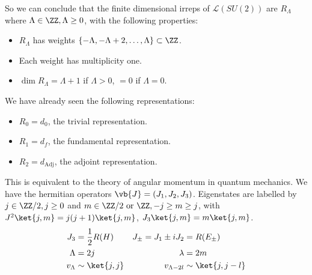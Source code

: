 \documentclass{jknotes}
\begin{document}
So we can conclude that the finite dimensional irreps of \(\mathcal{L}(SU(2))\) are \(R_\Lambda\) where \(\Lambda \in \ZZ, \Lambda \ge 0\), with the following properties:
\begin{itemize}
    \item \(R_\Lambda\) has weights \(\{-\Lambda,-\Lambda+2,\dots,\Lambda\} \subset \ZZ\).
    \item Each weight has multiplicity one.
    \item \(\dim R_\Lambda = \Lambda+1\) if \(\Lambda > 0\), \(= 0\) if \(\Lambda = 0\).
\end{itemize}
\begin{eg}
    We have already seen the following representations:
    \begin{itemize}
        \item \(R_0 = d_0\), the trivial representation.
        \item \(R_1 = d_f\), the fundamental representation.
        \item \(R_2 = d_\text{Adj}\), the adjoint representation.
    \end{itemize}
\end{eg}
This is equivalent to the theory of angular momentum in quantum mechanics. We have the hermitian operators \(\vb{J} = (J_1,J_2,J_3)\). Eigenstates are labelled by \(j \in \ZZ/2, j\ge 0\) and  \(m \in \ZZ/2 \text{ or } \ZZ, -j\ge m\ge j\), with \(J^2\ket{j,m} = j(j+1)\ket{j,m}\), \(J_3\ket{j,m} = m\ket{j,m}\).
\begin{align}
    J_3 &= \frac{1}{2}R(H) & J_\pm = J_1 \pm iJ_2 &= R(E_\pm) \\
    \Lambda &= 2j & \lambda &= 2m \\
    v_\Lambda &\sim \ket{j,j} & v_{\Lambda-2l} &\sim \ket{j,j-l}
\end{align}
\end{document}
